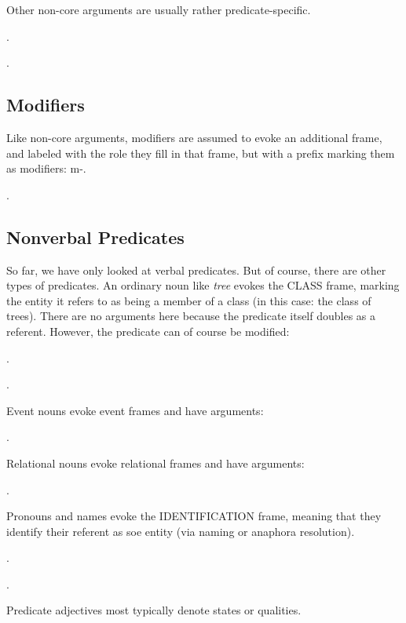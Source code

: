 \documentclass[a4paper]{article}
\newcommand{\fr}[1]{\textsf{#1}}
\newcommand{\rl}[1]{\textsf{#1}}
\begin{document}
Other non-core arguments are usually rather predicate-specific.

\ex.

\ex.

\subsection{Modifiers}

Like non-core arguments, modifiers are assumed to evoke an additional frame,
and labeled with the role they fill in that frame, but with a prefix marking
them as modifiers: \rl{m-}.

\ex.

\subsection{Nonverbal Predicates}

So far, we have only looked at verbal predicates. But of course, there are
other types of predicates. An ordinary noun like \emph{tree} evokes the
\fr{CLASS} frame, marking the entity it refers to as being a member of a class
(in this case: the class of trees). There are no arguments here because the
predicate itself doubles as a referent. However, the predicate can of course be
modified:

\ex.

\ex.

Event nouns evoke event frames and have arguments:

\ex.

Relational nouns evoke relational frames and have arguments:

\ex.

Pronouns and names evoke the \fr{IDENTIFICATION} frame, meaning that they
identify their referent as soe entity (via naming or anaphora resolution).

\ex.

\ex.

Predicate adjectives most typically denote states or qualities.
\end{document}
